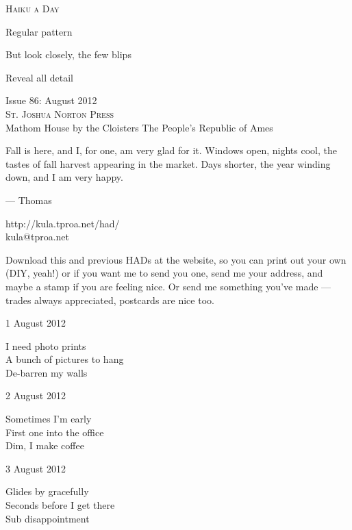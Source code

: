 \documentclass[12pt]{article}
\begin{document}
\begin{center}
{\fontsize{36}{48}\selectfont \textsc{Haiku a Day }}
\end{center}

\vspace*{3.5cm}

{\fontsize{20}{40}\selectfont 

Regular pattern

But look closely, the few blips

Reveal all detail


}

\vspace*{5.0cm}
\begin{center}
{\large{Issue 86: August 2012}} \\[5mm]
{\fontsize{8}{8}\selectfont  \textsc{ St. Joshua Norton Press }} \\[1mm]
{\fontsize{6}{6}\selectfont Mathom House by the Cloisters \textbar The People's Republic of Ames }
\end{center}


\newpage

Fall is here, and I, for one, am very glad for it. Windows open,
nights cool, the tastes of fall harvest appearing in the market.
Days shorter, the year winding down, and I am very happy.

--- Thomas

http://kula.tproa.net/had/ \\
kula@tproa.net

Download this and previous HADs at the website, so you can
print out your own (DIY, yeah!) or if you want me to send
you one, send me your address, and maybe a stamp if you
are feeling nice. Or send me something you've made ---
trades always appreciated, postcards are nice too.

\vfill

1 August 2012

I need photo prints \\
A bunch of pictures to hang \\
De-barren my walls

2 August 2012

Sometimes I'm early \\
First one into the office \\
Dim, I make coffee

3 August 2012

Glides by gracefully \\
Seconds before I get there \\
Sub disappointment
\end{document}
